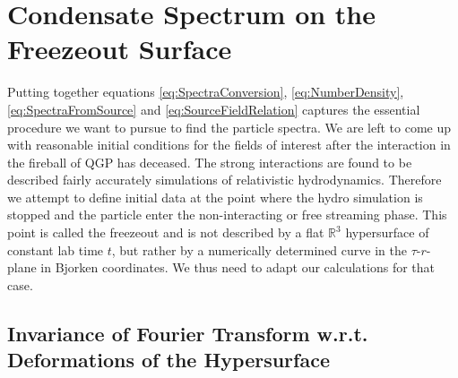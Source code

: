 \chapter{Condensate Spectrum on the Freezeout Surface}

Putting together equations \eqref{eq:SpectraConversion}, \eqref{eq:NumberDensity}, \eqref{eq:SpectraFromSource} and \eqref{eq:SourceFieldRelation} captures the essential procedure we want to pursue to find the particle spectra. We are left to come up with reasonable initial conditions for the fields of interest after the interaction in the fireball of QGP has deceased. The strong interactions are found to be described fairly accurately simulations of relativistic hydrodynamics. Therefore we attempt to define initial data at the point where the hydro simulation is stopped and the particle enter the non-interacting or free streaming phase. This point is called the freezeout and is not described by a flat $\mathbb{R}^3$ hypersurface of constant lab time $t$, but rather by a numerically determined curve in the $\tau$-$r$-plane in Bjorken coordinates. We thus need to adapt our calculations for that case. 

\section{Invariance of Fourier Transform w.r.t. Deformations of the Hypersurface}
\label{subsec:FourierDeformHypersurface}

